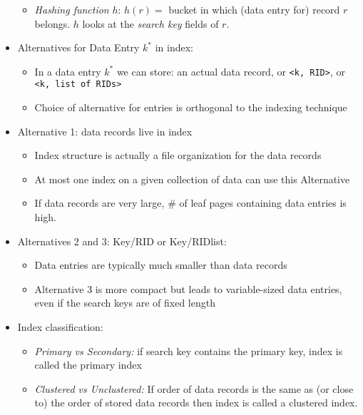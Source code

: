\documentclass[landscape,8pt]{extarticle}
\newcommand{\code}{\lstinline}
\begin{document}
\begin{multicols}{4}
\begin{itemize}
\begin{itemize}
                  \item \emph{Hashing function} $h$: $h(r) = $ bucket in which (data entry for) record $r$ belongs. $h$ looks at the \emph{search key} fields of $r$.
              \end{itemize}
        \item Alternatives for Data Entry $k^*$ in index:
              \begin{itemize}
                  \item In a data entry $k^*$ we can store: an actual data record, or \code{<k, RID>}, or \code{<k, list of RIDs>}
                  \item Choice of alternative for entries is orthogonal to the indexing technique
              \end{itemize}
        \item Alternative 1: data records live in index
              \begin{itemize}
                  \item Index structure is actually a file organization for the data records
                  \item At most one index on a given collection of data can use this Alternative
                  \item If data records are very large, \# of leaf pages containing data entries is high.
              \end{itemize}
        \item Alternatives 2 and 3: Key/RID or Key/RIDlist:
              \begin{itemize}
                  \item Data entries are typically much smaller than data records
                  \item Alternative 3 is more compact but leads to variable-sized data entries, even if the search keys are of fixed length
              \end{itemize}
        \item Index classification:
              \begin{itemize}
                  \item \emph{Primary vs Secondary:} if search key contains the primary key, index is called the primary index
                  \item \emph{Clustered vs Unclustered:} If order of data records is the same as (or close to) the order of stored data records then index is called a clustered index.
              \end{itemize}

\end{itemize}
\end{multicols}
\end{document}
